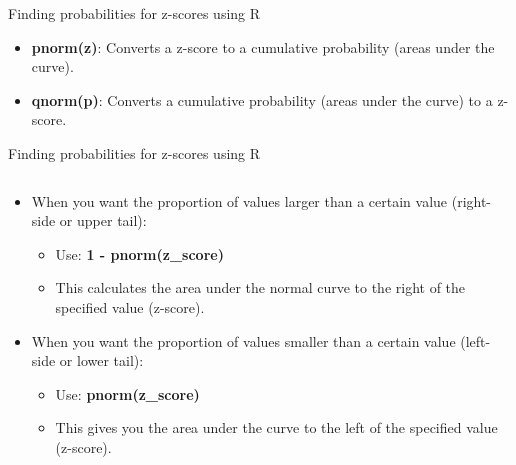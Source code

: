 \documentclass[
  ignorenonframetext,
]{beamer}
\providecommand{\tightlist}{%
  \setlength{\itemsep}{0pt}\setlength{\parskip}{0pt}}
\begin{document}
\begin{frame}{Finding probabilities for z-scores using R}
\label{finding-probabilities-for-z-scores-using-r}
\begin{itemize}
\tightlist
\item
  \textbf{pnorm(z)}: Converts a z-score to a cumulative probability
  (areas under the curve).
\end{itemize}

\begin{itemize}
\tightlist
\item
  \textbf{qnorm(p)}: Converts a cumulative probability (areas under the
  curve) to a z-score.
\end{itemize}
\end{frame}

\begin{frame}{Finding probabilities for z-scores using R}
\label{finding-probabilities-for-z-scores-using-r-1}
\begin{columns}[T]
\begin{column}{0.5\textwidth}
\small

\begin{itemize}
\tightlist
\item
  When you want the proportion of values larger than a certain value
  (right-side or upper tail):\\
  \centering

  \begin{itemize}
  \tightlist
  \item
    Use: \textbf{1 - pnorm(z\_score)}\\
  \item
    This calculates the area under the normal curve to the right of the
    specified value (z-score).
  \end{itemize}
\end{itemize}

\begin{itemize}
\tightlist
\item
  When you want the proportion of values smaller than a certain value
  (left-side or lower tail): \centering

  \begin{itemize}
  \tightlist
  \item
    Use: \textbf{pnorm(z\_score)}\\
  \item
    This gives you the area under the curve to the left of the specified
    value (z-score).\\
  \end{itemize}
\end{itemize}
\end{column}


\end{columns}
\end{frame}
\end{document}
